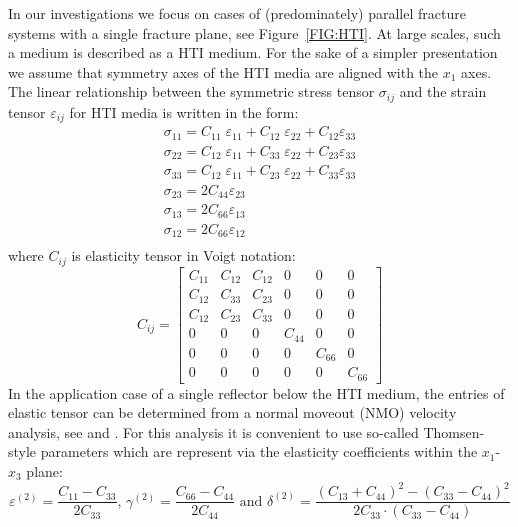\documentclass[review,authoryear]{elsarticle}
\begin{document}
In our investigations we focus on cases of (predominately) parallel fracture systems with a single fracture plane, see Figure~\ref{FIG:HTI}. At large scales, such a medium is described as a HTI medium. For the sake of a simpler presentation we assume that symmetry axes of the HTI media are aligned 
with the $x_{1}$ axes. The linear relationship between the symmetric stress tensor $\sigma_{ij}$ and the strain tensor $\varepsilon_{ij}$ 
for HTI media is written in the form:
\begin{equation}\label{EQ:STRESS-STRAIN}
\begin{array}{ccc}
\sigma_{11} = C_{11} \; \varepsilon_{11} +  C_{12} \; \varepsilon_{22} +  C_{12}\varepsilon_{33} \\
\sigma_{22} = C_{12} \; \varepsilon_{11} +  C_{33} \; \varepsilon_{22} +  C_{23}\varepsilon_{33} \\              
\sigma_{33} = C_{12} \; \varepsilon_{11} +  C_{23} \; \varepsilon_{22} +  C_{33}\varepsilon_{33} \\ 
\sigma_{23} = 2 C_{44}\varepsilon_{23} \\ 
\sigma_{13} = 2 C_{66}\varepsilon_{13} \\ 
\sigma_{12} = 2 C_{66}\varepsilon_{12} \\
\end{array}
\end{equation}
where $C_{ij}$ is elasticity tensor in Voigt notation:
\begin{equation}\label{EQ:ELASTENSOR}
  C_{ij} = \left[
  \begin{array}{cccccc}
 C_{11} & C_{12} & C_{12} & 0 & 0 & 0 \\
 C_{12} & C_{33} & C_{23} & 0 & 0 & 0 \\
 C_{12} & C_{23} & C_{33} & 0 & 0 & 0 \\
 0 & 0 & 0 & C_{44} & 0 & 0 \\
 0 & 0 & 0 & 0 & C_{66} & 0 \\
 0 & 0 & 0 & 0 & 0 & C_{66} 
\end{array}
  \right]
\end{equation} 
In the application case of a single reflector below the HTI medium, the entries of elastic tensor can  be determined from a normal moveout (NMO) velocity analysis, see \cite{Tsvankin1997b} and \cite{Tsvankin1997a}. For this analysis it is convenient to use so-called Thomsen-style parameters \citep{Tsvankin1997b}
 which are represent via the elasticity coefficients within the $x_{1}$-$x_{3}$ plane:
\begin{equation}\label{EQ:Thomsen:2}
\varepsilon^{(2)}=\frac{C_{11}-C_{33}}{2C_{33}} \mbox{, }
\gamma^{(2)}=\frac{C_{66}-C_{44}}{2C_{44}} \mbox{ and }
\delta^{(2)}=\frac{(C_{13}+C_{44})^2-(C_{33}-C_{44})^2}{2C_{33}\cdot(C_{33}-C_{44})}
\end{equation}
\end{document}
